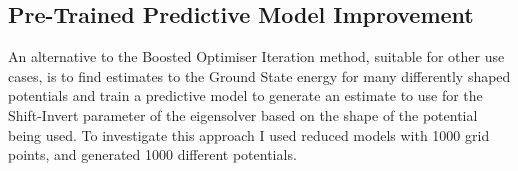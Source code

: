 %
%
%	
%	
%	
%
%
%
%
%	
%
\subsection{Pre-Trained Predictive Model Improvement}

An alternative to the Boosted Optimiser Iteration method, suitable for other use cases, is to find estimates to the Ground State energy for many differently shaped potentials and train a predictive model to generate an estimate to use for the Shift-Invert parameter of the eigensolver based on the shape of the potential being used. To investigate this approach I used reduced models with 1000 grid points, and generated 1000 different potentials. 

